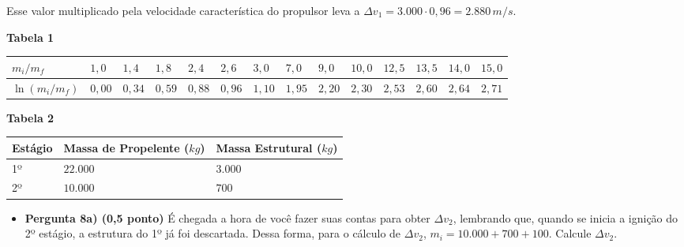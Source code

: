 \documentclass[a4paper, 12pt]{article}
\begin{document}
\begin{flushleft}
\begin{itemize}
Esse valor multiplicado pela velocidade característica do propulsor leva a $\Delta v_1= 3.000 · 0,96 = 2.880 \, m/s$.
            \begin{center}
                \textbf{Tabela 1} \linebreak \linebreak
                \begin{tabular}
                {
                    |M{0.1\textwidth}|M{0.04\textwidth}|M{0.04\textwidth}|M{0.04\textwidth}|M{0.04\textwidth}|M{0.04\textwidth}|M{0.04\textwidth}|M{0.04\textwidth}|M{0.04\textwidth}|M{0.04\textwidth}|M{0.04\textwidth}|M{0.04\textwidth}|M{0.04\textwidth}|M{0.04\textwidth}|
                }
                    \hline
                    $m_i/m_f$ & $1,0$ & $1,4$ & $1,8$ & $2,4$ & $2,6$ & $3,0$ & $7,0$ & $9,0$ & $10,0$ & $12,5$ & $13,5$ & $14,0$ & $15,0$ \\ \hline
                    $\ln (m_i/m_f)$ & $0,00$ & $0,34$ & $0,59$ & $0,88$ & $0,96$ & $1,10$ & $1,95$ & $2,20$ & $2,30$ & $2,53$ & $2,60$ & $2,64$ & $2,71$ \\ \hline
                \end{tabular}
            \end{center}
            \begin{center}
                \textbf{Tabela 2} \linebreak \linebreak
                \begin{tabular}
                {
                    |M{0.1\textwidth}|M{0.3\textwidth}|M{0.3\textwidth}|
                }
                    \hline
                    Estágio & Massa de Propelente ($kg$) & Massa Estrutural ($kg$) \\ \hline
                    1º & $22.000$ & $3.000$ \\ \hline
                    2º & $10.000$ & $700$ \\ \hline
                \end{tabular}
            \end{center}
            \begin{itemize}
                \item \textbf{Pergunta 8a) (0,5 ponto)} É chegada a hora de você fazer suas contas para obter $\Delta v_2$, lembrando que, quando se inicia a ignição do 2º estágio, a estrutura do 1º já foi descartada. Dessa forma, para o cálculo de $\Delta v_2$, $m_i = 10.000 + 700 + 100$. Calcule $\Delta v_2$.
                    \begin{itemize}

\end{itemize}
\end{itemize}
\end{itemize}
\end{flushleft}
\end{document}
